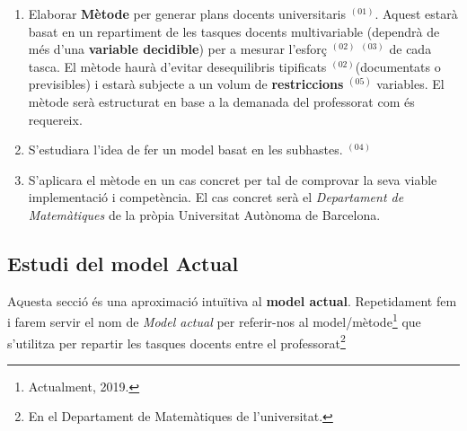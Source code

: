 \documentclass[10pt,twocolumn]{article}
\begin{document}
\begin{tcolorbox}[colback=black!1,title=\textbf{0bjectius},coltitle=black,colbacktitle=black!10]
	\begin{enumerate}
	\item Elaborar \textbf{Mètode} per generar plans docents universitaris{\color{cyan!80} $^{(01)}$}. Aquest estarà basat en un repartiment de les tasques docents multivariable (dependrà de més d'una \textbf{variable decidible}) per a mesurar l'esforç{\color{blue!80} $^{(02)}$}{\color{green!80} $^{(03)}$} de cada tasca. El mètode haurà d'evitar desequilibris tipificats{\color{blue!80} $^{(02)}$}(documentats o previsibles) i estarà subjecte a un volum de \textbf{restriccions}{\color{violet!60} $^{(05)}$} variables. El mètode serà estructurat en base a la demanada del professorat com és requereix.
	\item S'estudiara l'idea de fer un model  basat en les subhastes.{\color{purple!80} $^{(04)}$} 
	\item S'aplicara el mètode en un cas concret per tal de comprovar la seva viable implementació i competència. El cas concret serà el \textit{Departament de Matemàtiques} de la pròpia Universitat Autònoma de Barcelona.
	\end{enumerate}
\end{tcolorbox}
\vspace{5mm}
\newpage
\begin{tcolorbox}[colframe=white,colback=redviolet!20,sharp corners=all,size=minimal,halign=center,valign=center]
\section{Estudi del model Actual}
\end{tcolorbox}
\lettrine{A}questa secció és una aproximació intuïtiva al \textbf{model actual}. Repetidament fem i farem servir el nom de \textit{Model actual}  per referir-nos al model/mètode\footnote{Actualment, 2019.} que s'utilitza per repartir les tasques docents entre el professorat\footnote{En el Departament de Matemàtiques de l'universitat.}
\end{document}
